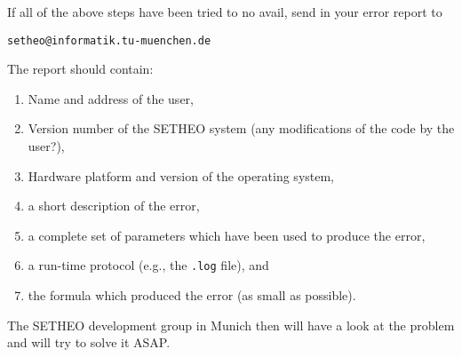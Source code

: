 If all of the above steps have been tried to no avail,
send in your error report to
\begin{center}
{\tt setheo@informatik.tu-muenchen.de}
\end{center}
The report should contain:

\begin{enumerate}
\item
Name and address of the user,
\item
Version number of the SETHEO system (any modifications of the
code by the user?),
\item
Hardware platform and version of the operating system,
\item
a short description of the error,
\item
a complete set of parameters which have been used to produce the
error,
\item
a run-time protocol (e.g., the {\tt .log} file), and
\item
the formula which produced the error (as small as possible).
\end{enumerate}

The SETHEO development group in Munich then will have a look at the
problem and will try to solve it ASAP.
